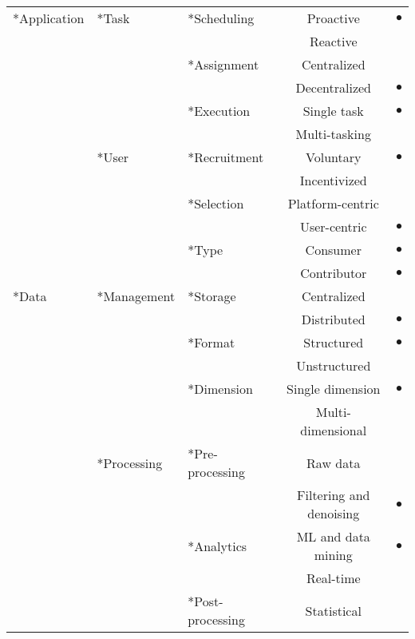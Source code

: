 \begin{table}[htb]
\renewcommand{\arraystretch}{0.85}
\scriptsize
\centering
\begin{tabularx}{\textwidth}{
    >{\centering\arraybackslash}X
    >{\centering\arraybackslash}X
    >{\centering\arraybackslash}X
    c
    >{\centering\arraybackslash}X}
\toprule
\multirow{12}*{Application}
	& \multirow{6}*{Task}
		& \multirow{2}*{Scheduling}
			& Proactive & $\bullet$ \\
			&&& Reactive & \\
		\cmidrule{3-5}
		&& \multirow{2}*{Assignment}
			& Centralized & \\
			&&& Decentralized & $\bullet$ \\
		\cmidrule{3-5}
		&& \multirow{2}*{Execution}
			& Single task & $\bullet$ \\
			&&& Multi-tasking & \\
	\cmidrule{2-5}
	& \multirow{6}*{User}
		& \multirow{2}*{Recruitment}
			& Voluntary & $\bullet$ \\
			&&& Incentivized & \\
		\cmidrule{3-5}
		&& \multirow{2}*{Selection}
			& Platform-centric & \\
			&&& User-centric & $\bullet$ \\
		\cmidrule{3-5}
		&& \multirow{2}*{Type}
			& Consumer & $\bullet$ \\
			&&& Contributor & $\bullet$ \\
		\cmidrule{2-5}
\cmidrule{1-5}
\multirow{12}*{Data}
	& \multirow{6}*{Management}
		& \multirow{2}*{Storage}
			& Centralized & \\
			&&& Distributed & $\bullet$ \\
		\cmidrule{3-5}
		&& \multirow{2}*{Format}
			& Structured & $\bullet$ \\
			&&& Unstructured & \\
		\cmidrule{3-5}
		&& \multirow{2}*{Dimension}
			& Single dimension & $\bullet$ \\
			&&& Multi-dimensional & \\
	\cmidrule{2-5}
	& \multirow{6}*{Processing}
		& \multirow{2}*{Pre-processing}
			& Raw data & \\
			&&& Filtering and denoising & $\bullet$ \\
		\cmidrule{3-5}
		&& \multirow{2}*{Analytics}
			& ML and data mining & $\bullet$ \\
			&&& Real-time & \\
		\cmidrule{3-5}
		&& \multirow{2}*{Post-processing}
			& Statistical & \\

\end{tabularx}
\end{table}
